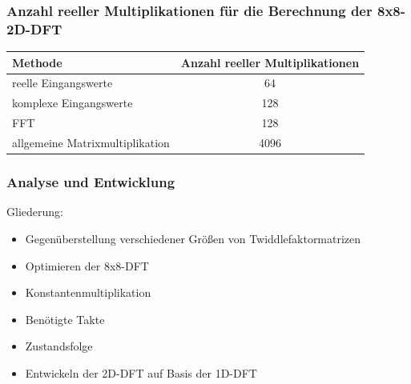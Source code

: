 \begin{frame}\frametitle{Anzahl reeller Multiplikationen für die Berechnung der 8x8-2D-DFT}

\begin{table}[ht!]
\centering
 \begin{tabular}{lc}
  \hline
  Methode  & Anzahl reeller Multiplikationen\\
  \hline
  reelle Eingangswerte   & 64\\
  komplexe Eingangswerte & 128\\
  FFT   & 128\\
  allgemeine Matrixmultiplikation & 4096\\
  \hline
 \end{tabular}
 \label{tab:AuflistungMultiplikationen}
\end{table} 
\end{frame}



\begin{frame}\frametitle{Analyse und Entwicklung}
Gliederung:
 \begin{itemize}
  \item Gegenüberstellung verschiedener Größen von Twiddlefaktormatrizen
  \item Optimieren der 8x8-DFT
  \item Konstantenmultiplikation
  \item Benötigte Takte
  \item Zustandsfolge
  \item Entwickeln der 2D-DFT auf Basis der 1D-DFT
 \end{itemize}

\end{frame}



